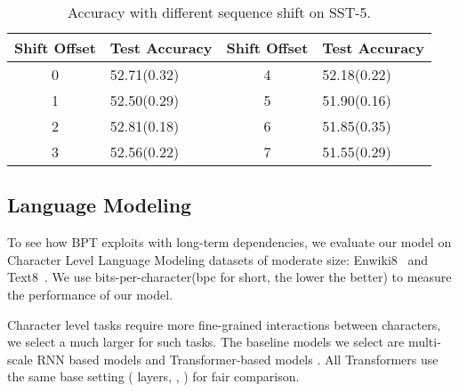 \documentclass[11pt,a4paper]{article}
\begin{document}
\begin{table}[!htb]\small\setlength{\tabcolsep}{3pt}
\centering
\begin{tabular}{cl|cl}
\toprule
Shift Offset& Test Accuracy & Shift Offset& Test Accuracy\\
\midrule
0     & 52.71(0.32) & 4 & 52.18(0.22)  \\
1     & 52.50(0.29) & 5 &  51.90(0.16)  \\
2     & 52.81(0.18) & 6 & 51.85(0.35)  \\
3     & 52.56(0.22) & 7 & 51.55(0.29)  \\
\bottomrule
\end{tabular}
\caption{Accuracy with different sequence shift on SST-5.}
\label{tbl:shift}
\end{table}

\begin{comment}
\begin{table}[!htb]
\centering
\begin{tabular}{ll}
\toprule
shift & test accuracy \\
\midrule
0     & 52.71(0.32)   \\
1     & 52.50(0.29)   \\
2     & 52.81(0.18)   \\
3     & 52.56(0.22)   \\
4     & 52.18(0.22)   \\
5     & 51.90(0.16)   \\
6     & 51.85(0.35)   \\
\bottomrule
\end{tabular}
\end{table}
\end{comment}



\subsection{Language Modeling}
\label{sec:char}

To see how BPT exploits with long-term dependencies, we evaluate our model on Character Level Language Modeling datasets of moderate size: Enwiki8~\cite{mmllc:2009} and Text8~\cite{mmllc:2009}. We use bits-per-character(bpc for short, the lower the better) to measure the performance of our model.

Character level tasks require more fine-grained interactions between characters, we select a much larger  for such tasks. The baseline models we select are multi-scale RNN based models \cite{ChungAB17, ZillySKS17, krause2016multiplicative} and Transformer-based models \cite{al2018character, dai2019transformer, sukhbaatar2019adaptive}. All Transformers use the same base setting ( layers, , ) for fair comparison.
\end{document}
